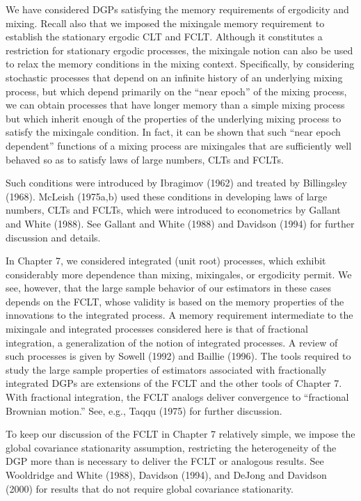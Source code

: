 We have considered DGPs satisfying the memory requirements of ergodicity and mixing. Recall also that we imposed the mixingale memory
requirement to establish the stationary ergodic CLT and FCLT. Although
it constitutes a restriction for stationary ergodic processes, the mixingale
notion can also be used to relax the memory conditions in the mixing context. Specifically, by considering stochastic processes that depend on an
infinite history of an underlying mixing process, but which depend primarily on the ``near epoch'' of the mixing process, we can obtain processes that
have longer memory than a simple mixing process but which inherit enough
of the properties of the underlying mixing process to satisfy the mixingale
condition. In fact, it can be shown that such ``near epoch dependent'' functions of a mixing process are mixingales that are sufficiently well behaved
so as to satisfy laws of large numbers, CLTs and FCLTs.

Such conditions were introduced by Ibragimov (1962) and treated by
Billingsley (1968). McLeish (1975a,b) used these conditions in developing
laws of large numbers, CLTs and FCLTs, which were introduced to econometrics by Gallant and White (1988). See Gallant and White (1988) and
Davidson (1994) for further discussion and details.

In Chapter 7, we considered integrated (unit root) processes, which exhibit considerably more dependence than mixing, mixingales, or ergodicity
permit. We see, however, that the large sample behavior of our estimators in these cases depends on the FCLT, whose validity is based on the
memory properties of the innovations to the integrated process. A memory
requirement intermediate to the mixingale and integrated processes considered here is that of fractional integration, a generalization of the notion of
integrated processes. A review of such processes is given by Sowell (1992)
and Baillie (1996). The tools required to study the large sample properties
of estimators associated with fractionally integrated DGPs are extensions
of the FCLT and the other tools of Chapter 7. With fractional integration,
the FCLT analogs deliver convergence to ``fractional Brownian motion.''
See, e.g., Taqqu (1975) for further discussion.

To keep our discussion of the FCLT in Chapter 7 relatively simple, we
impose the global covariance stationarity assumption, restricting the heterogeneity of the DGP more than is necessary to deliver the FCLT or
analogous results. See Wooldridge and White (1988), Davidson (1994), and
DeJong and Davidson (2000) for results that do not require global covariance stationarity.

